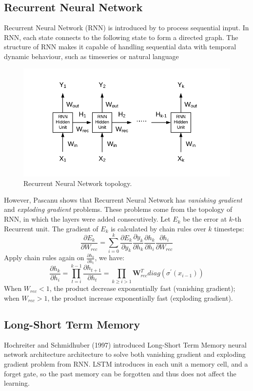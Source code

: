\documentclass[11pt]{article}
\begin{document}
\subsection{Recurrent Neural Network}
Recurrent Neural Network (RNN) is introduced by \cite{rumelhart1988learning} to
process sequential input. In RNN, each state connects to the following state
to form a directed graph. The structure of RNN makes it capable of handling
sequential data with temporal dynamic behaviour, such as timeseries or natural
language 
\begin{figure}[H]
  \centering
  \includegraphics[width=\textwidth,keepaspectratio]{figs/rnn.png}
  \caption{Recurrent Neural Network topology.}
\end{figure}
However, Pascanu \cite{pascanu2013difficulty} shows that Recurrent Neural
Network has \textit{vanishing gradient} and \textit{exploding gradient}
problems. These problems come from the topology of RNN, in which the layers were
added consecutively. Let $E_k$ be the error at $k$-th Recurrent unit. The
gradient of $E_k$ is calculated by chain rules over $k$ timesteps:
$$
\frac{\partial E_k}{\partial W_{rec}} = \sum_{i=0}^k
\frac{\partial E_k}{\partial y_k} \frac{\partial y_k}{\partial h_k}
\frac{\partial h_k}{\partial h_i} \frac{\partial h_i}{\partial W_{rec}} 
$$
Apply chain rules again on $\frac{\partial h_k}{\partial h_i}$, we have:
$$
\frac{\partial h_k}{\partial h_i} = \prod_{t=i}^{k-1}\frac{\partial
  h_{t+1}}{\partial h_t} = \prod_{k\geq i > 1} \mathbf{W}_{rec}^T
\mathit{diag}(\sigma^{\prime} (x_{i-1})) 
$$
When $W_{rec}<1$, the product decrease exponentially fast (vanishing gradient);
when $W_{rec}>1$, the product increase exponentially fast (exploding gradient).
\subsection{Long-Short Term Memory}
Hochreiter and Schmidhuber (1997) \cite{gers1999learning} introduced Long-Short
Term Memory neural network architecture architecture to solve both vanishing
gradient and exploding gradient problem from RNN. LSTM introduces in each unit a
memory cell, and a forget gate, so the past memory can be forgotten and thus
does not affect the learning.
\end{document}
